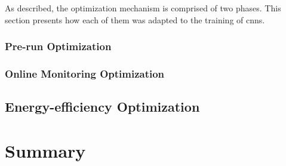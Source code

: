 As described, the optimization mechanism is comprised of two phases. This section presents how each of them was adapted to the training of \acrshort{cnn}s.


\subsubsection{Pre-run Optimization}

\subsubsection{Online Monitoring Optimization}



\subsection{Energy-efficiency Optimization}



\section{Summary}







